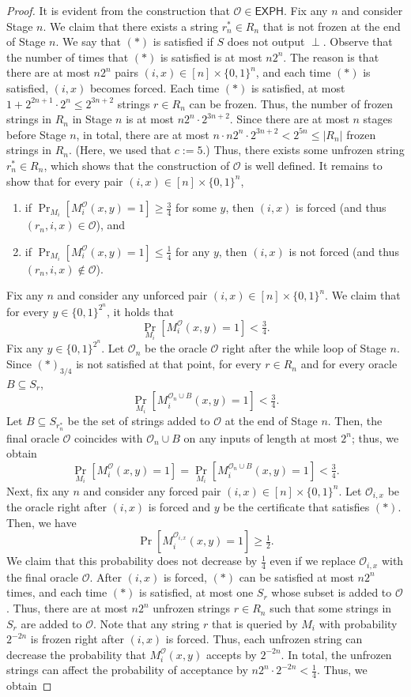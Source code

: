\documentclass[10pt,a4paper]{article}
\begin{document}
\begin{proof}
It is evident from the construction that $\mathcal O\in\mathsf{EXPH}$.
Fix any $n$ and consider Stage $n$. We claim that there exists a string $r_n^*\in R_n$ that is not frozen at the end of Stage $n$. We say that $(*)$ is satisfied if $S$ does not output $\perp$. Observe that the number of times that $(*)$ is satisfied is at most $n2^n$. The reason is that there are at most $n2^n$ pairs $(i,x)\in[n]\times\{0,1\}^n$, and each time $(*)$ is satisfied, $(i,x)$ becomes forced. Each time $(*)$ is satisfied, at most $1+2^{2n+1}\cdot2^n\leq2^{3n+2}$ strings $r\in R_n$ can be frozen. Thus, the number of frozen strings in $R_n$ in Stage $n$ is at most $n2^n\cdot2^{3n+2}$. Since there are at most $n$ stages before Stage $n$, in total, there are at most $n\cdot n2^n\cdot2^{3n+2}<2^{5n}\leq|R_n|$ frozen strings in $R_n$. (Here, we used that $c:=5$.) Thus, there exists some unfrozen string $r_n^*\in R_n$, which shows that the construction of $\mathcal O$ is well defined.
It remains to show that for every pair $(i,x)\in[n]\times\{0,1\}^n$,
\begin{enumerate}
\item if $\Pr_{M_i}[M_i^{\mathcal O}(x,y)=1]\geq\frac34$ for some $y$, then $(i,x)$ is forced (and thus $(r_n,i,x)\in\mathcal O$), and
\item if $\Pr_{M_i}[M_i^{\mathcal O}(x,y)=1]\leq\frac14$ for any $y$, then $(i,x)$ is not forced (and thus $(r_n,i,x)\notin\mathcal O$).
\end{enumerate}
Fix any $n$ and consider any unforced pair $(i,x)\in[n]\times\{0,1\}^n$. We claim that for every $y\in\{0,1\}^{2^n}$, it holds that
\[\Pr_{M_i}[M_i^{\mathcal O}(x,y)=1]<\tfrac34.\]
Fix any $y\in\{0,1\}^{2^n}$. Let $\mathcal O_n$ be the oracle $\mathcal O$ right after the while loop of Stage $n$. Since $(*)_{3/4}$ is not satisfied at that point, for every $r\in R_n$ and for every oracle $B\subseteq S_r$,
\[\Pr_{M_i}[M_i^{\mathcal O_n\cup B}(x,y)=1]<\tfrac34.\]
Let $B\subseteq S_{r_n^*}$ be the set of strings added to $\mathcal O$ at the end of Stage $n$. Then, the final oracle $\mathcal O$ coincides with $\mathcal O_n\cup B$ on any inputs of length at most $2^n$; thus, we obtain
\[\Pr_{M_i}[M_i^{\mathcal O}(x,y)=1]=\Pr_{M_i}[M_i^{\mathcal O_n\cup B}(x,y)=1]<\tfrac34.\]
Next, fix any $n$ and consider any forced pair $(i,x)\in[n]\times\{0,1\}^n$. Let $\mathcal O_{i,x}$ be the oracle right after $(i,x)$ is forced and $y$ be the certificate that satisfies $(*)$. Then, we have
\[\Pr[M_i^{\mathcal O_{i,x}}(x,y)=1]\geq\tfrac12.\]
We claim that this probability does not decrease by $\frac14$ even if we replace $\mathcal O_{i,x}$ with the final oracle $\mathcal O$. After $(i,x)$ is forced, $(*)$ can be satisfied at most $n2^n$ times, and each time $(*)$ is satisfied, at most one $S_r$ whose subset is added to $\mathcal O$. Thus, there are at most $n2^n$ unfrozen strings $r\in R_n$ such that some strings in $S_r$ are added to $\mathcal O$. Note that any string $r$ that is queried by $M_i$ with probability $2^{-2n}$ is frozen right after $(i,x)$ is forced. Thus, each unfrozen string can decrease the probability that $M_i^{\mathcal O}(x,y)$ accepts by $2^{-2n}$. In total, the unfrozen strings can affect the probability of acceptance by $n2^n\cdot2^{-2n}<\frac14$. Thus, we obtain

\end{proof}
\end{document}
